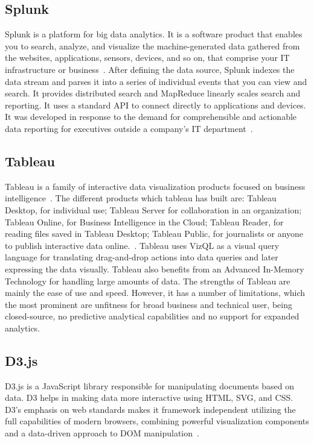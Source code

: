 \subsection{Splunk}

Splunk is a platform for big data analytics. It is a software product
that enables you to search, analyze, and visualize the
machine-generated data gathered from the websites, applications,
sensors, devices, and so on, that comprise your IT infrastructure or
business~\cite{www-splunk}. After defining the data source, Splunk
indexes the data stream and parses it into a series of individual
events that you can view and search. It provides distributed search
and MapReduce linearly scales search and reporting. It uses a standard
API to connect directly to applications and devices. It was developed
in response to the demand for comprehensible and actionable data
reporting for executives outside a company's IT
department~\cite{www-splunk}.
	  
\subsection{Tableau}

Tableau is a family of interactive data visualization products focused
on business intelligence~\cite{www-tableau-tutorial}. The different
products which tableau has built are: Tableau Desktop, for individual
use; Tableau Server for collaboration in an organization; Tableau
Online, for Business Intelligence in the Cloud; Tableau Reader, for
reading files saved in Tableau Desktop; Tableau Public, for
journalists or anyone to publish interactive data
online.~\cite{www-tableau-web}. Tableau uses VizQL as a visual query
language for translating drag-and-drop actions into data queries and
later expressing the data visually. Tableau also benefits from an
Advanced In-Memory Technology for handling large amounts of data.  The
strengths of Tableau are mainly the ease of use and speed.  However,
it has a number of limitations, which the most prominent are unfitness
for broad business and technical user, being closed-source, no
predictive analytical capabilities and no support for expanded
analytics.

\pv

\subsection{D3.js}

D3.js is a JavaScript library responsible for manipulating documents
based on data. D3 helps in making data more interactive using HTML,
SVG, and CSS. D3's emphasis on web standards makes it framework
independent utilizing the full capabilities of modern browsers,
combining powerful visualization components and a data-driven approach
to DOM manipulation~\cite{www-d3}.

